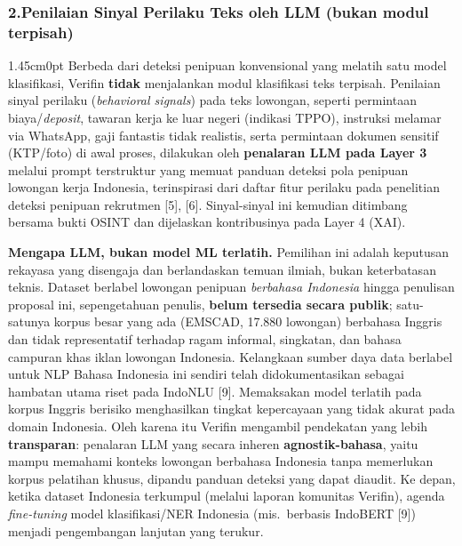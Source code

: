 \documentclass[12pt,a4paper]{article}
\begin{document}
\subsubsection*{2.\quad Penilaian Sinyal Perilaku Teks oleh LLM (bukan modul terpisah)}

\begin{adjustwidth}{1.45cm}{0pt}
\hspace*{0.85cm}Berbeda dari deteksi penipuan konvensional yang melatih satu model klasifikasi, Verifin
\textbf{tidak} menjalankan modul klasifikasi teks terpisah. Penilaian sinyal perilaku
(\textit{behavioral signals}) pada teks lowongan, seperti permintaan biaya/\textit{deposit},
tawaran kerja ke luar negeri (indikasi TPPO), instruksi melamar via WhatsApp, gaji fantastis
tidak realistis, serta permintaan dokumen sensitif (KTP/foto) di awal proses, dilakukan oleh
\textbf{penalaran LLM pada Layer 3} melalui prompt terstruktur yang memuat panduan deteksi pola
penipuan lowongan kerja Indonesia, terinspirasi dari daftar fitur perilaku pada penelitian
deteksi penipuan rekrutmen [5], [6]. Sinyal-sinyal ini kemudian ditimbang bersama bukti OSINT
dan dijelaskan kontribusinya pada Layer 4 (XAI).

\textbf{Mengapa LLM, bukan model ML terlatih.} Pemilihan ini adalah keputusan rekayasa
yang disengaja dan berlandaskan temuan ilmiah, bukan keterbatasan teknis. Dataset berlabel
lowongan penipuan \emph{berbahasa Indonesia} hingga penulisan proposal ini, sepengetahuan
penulis, \textbf{belum tersedia secara publik}; satu-satunya korpus besar yang ada (EMSCAD,
17.880 lowongan) berbahasa Inggris dan tidak representatif terhadap ragam informal, singkatan,
dan bahasa campuran khas iklan lowongan Indonesia. Kelangkaan sumber daya data berlabel untuk
NLP Bahasa Indonesia ini sendiri telah didokumentasikan sebagai hambatan utama riset pada
IndoNLU [9]. Memaksakan model terlatih pada korpus Inggris berisiko menghasilkan
tingkat kepercayaan yang tidak akurat pada domain Indonesia. Oleh karena itu Verifin
mengambil pendekatan yang lebih \textbf{transparan}: penalaran LLM yang secara inheren
\textbf{agnostik-bahasa}, yaitu mampu memahami konteks lowongan berbahasa Indonesia tanpa
memerlukan korpus pelatihan khusus, dipandu panduan deteksi yang dapat diaudit.
Ke depan, ketika dataset Indonesia terkumpul (melalui laporan komunitas Verifin), agenda
\textit{fine-tuning} model klasifikasi/NER Indonesia (mis.\ berbasis IndoBERT [9]) menjadi
pengembangan lanjutan yang terukur.
\end{adjustwidth}
\end{document}
